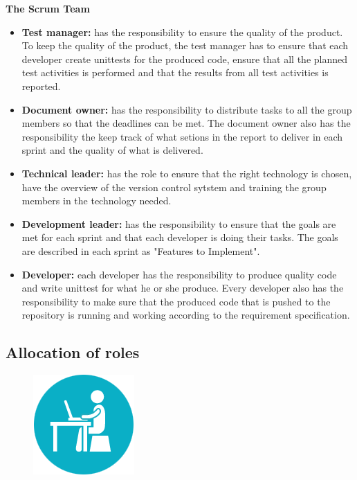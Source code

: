 \noindent
{\bf The Scrum Team}
\begin{itemize}

  \item {\bf Test manager:} has the responsibility to ensure the quality of the product. To keep the quality of the product, the test manager has to ensure that each developer create unittests for the produced code, ensure that all the planned test activities is performed and that the results from all test activities is reported.

  \item {\bf Document owner:} has the responsibility to distribute tasks to all the group members so that the deadlines can be met. The document owner also has the responsibility the keep track of what setions in the report to deliver in each sprint and the quality of what is delivered.

  \item {\bf Technical leader:} has the role to ensure that the right technology is chosen, have the overview of the version control sytstem and training the group members in the technology needed.

  \item {\bf Development leader:} has the responsibility to ensure that the goals are met for each sprint and that each developer is doing their tasks. The goals are described in each sprint as "Features to Implement". 

  \item {\bf Developer:} each developer has the responsibility to produce quality code and write unittest for what he or she produce. Every developer also has the responsibility to make sure that the produced code that is pushed to the repository is running and working according to the requirement specification.
  \end{itemize} 

\subsection{Allocation of roles}
\begin{figure}
  \begin{center}
  \includegraphics[scale=0.7]{pictures/Work.png}
  \end{center}
\end{figure}

